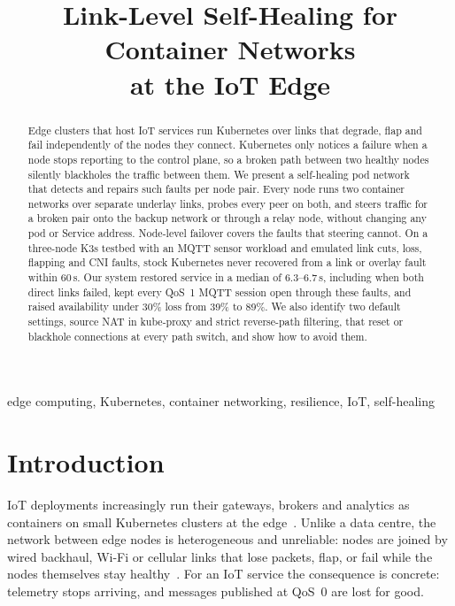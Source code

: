 \documentclass[conference,compsoc]{IEEEtran}
\begin{document}
\title{Link-Level Self-Healing for Container Networks\\at the IoT Edge}

\author{
}

\maketitle

\begin{abstract}
Edge clusters that host IoT services run Kubernetes over links that degrade, flap and
fail independently of the nodes they connect. Kubernetes only notices a failure when a
node stops reporting to the control plane, so a broken path between two healthy nodes
silently blackholes the traffic between them. We present a self-healing pod network
that detects and repairs such faults per node pair. Every node runs two container
networks over separate underlay links, probes every peer on both, and steers traffic
for a broken pair onto the backup network or through a relay node, without changing
any pod or Service address. Node-level failover covers the faults that steering cannot.
On a three-node K3s testbed with an MQTT sensor workload and emulated link cuts, loss,
flapping and CNI faults, stock Kubernetes never recovered from a link or overlay fault
within 60\,s. Our system restored service in a median of 6.3--6.7\,s, including when
both direct links failed, kept every QoS~1 MQTT session open through these faults, and
raised availability under 30\% loss from 39\% to 89\%. We also identify two default
settings, source NAT in kube-proxy and strict reverse-path filtering, that reset or
blackhole connections at every path switch, and show how to avoid them.
\end{abstract}

\begin{IEEEkeywords}
edge computing, Kubernetes, container networking, resilience, IoT, self-healing
\end{IEEEkeywords}

\section{Introduction}
\label{sec:intro}

IoT deployments increasingly run their gateways, brokers and analytics as containers
on small Kubernetes clusters at the edge~\cite{burns2016borg,kubeedge}. Unlike a data
centre, the network between edge nodes is heterogeneous and unreliable: nodes are
joined by wired backhaul, Wi-Fi or cellular links that lose packets, flap, or fail
while the nodes themselves stay healthy~\cite{huang2017gray}. For an IoT service the
consequence is concrete: telemetry stops arriving, and messages published at QoS~0 are
lost for good.
\end{document}
